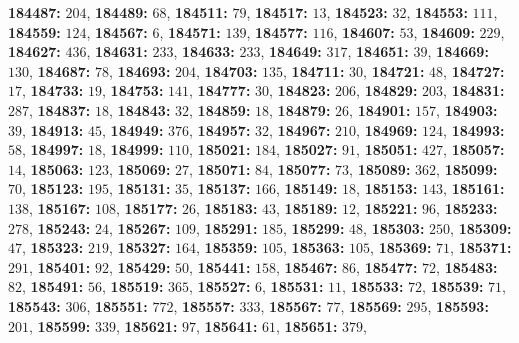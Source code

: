 \textsf{\bfseries 184487:} $204$, \textsf{\bfseries 184489:} $68$, \textsf{\bfseries 184511:} $79$, \textsf{\bfseries 184517:} $13$, \textsf{\bfseries 184523:} $32$, \textsf{\bfseries 184553:} $111$, \textsf{\bfseries 184559:} $124$, \textsf{\bfseries 184567:} $6$, \textsf{\bfseries 184571:} $139$, \textsf{\bfseries 184577:} $116$, \textsf{\bfseries 184607:} $53$, \textsf{\bfseries 184609:} $229$, \textsf{\bfseries 184627:} $436$, \textsf{\bfseries 184631:} $233$, \textsf{\bfseries 184633:} $233$, \textsf{\bfseries 184649:} $317$, \textsf{\bfseries 184651:} $39$, \textsf{\bfseries 184669:} $130$, \textsf{\bfseries 184687:} $78$, \textsf{\bfseries 184693:} $204$, \textsf{\bfseries 184703:} $135$, \textsf{\bfseries 184711:} $30$, \textsf{\bfseries 184721:} $48$, \textsf{\bfseries 184727:} $17$, \textsf{\bfseries 184733:} $19$, \textsf{\bfseries 184753:} $141$, \textsf{\bfseries 184777:} $30$, \textsf{\bfseries 184823:} $206$, \textsf{\bfseries 184829:} $203$, \textsf{\bfseries 184831:} $287$, \textsf{\bfseries 184837:} $18$, \textsf{\bfseries 184843:} $32$, \textsf{\bfseries 184859:} $18$, \textsf{\bfseries 184879:} $26$, \textsf{\bfseries 184901:} $157$, \textsf{\bfseries 184903:} $39$, \textsf{\bfseries 184913:} $45$, \textsf{\bfseries 184949:} $376$, \textsf{\bfseries 184957:} $32$, \textsf{\bfseries 184967:} $210$, \textsf{\bfseries 184969:} $124$, \textsf{\bfseries 184993:} $58$, \textsf{\bfseries 184997:} $18$, \textsf{\bfseries 184999:} $110$, \textsf{\bfseries 185021:} $184$, \textsf{\bfseries 185027:} $91$, \textsf{\bfseries 185051:} $427$, \textsf{\bfseries 185057:} $14$, \textsf{\bfseries 185063:} $123$, \textsf{\bfseries 185069:} $27$, \textsf{\bfseries 185071:} $84$, \textsf{\bfseries 185077:} $73$, \textsf{\bfseries 185089:} $362$, \textsf{\bfseries 185099:} $70$, \textsf{\bfseries 185123:} $195$, \textsf{\bfseries 185131:} $35$, \textsf{\bfseries 185137:} $166$, \textsf{\bfseries 185149:} $18$, \textsf{\bfseries 185153:} $143$, \textsf{\bfseries 185161:} $138$, \textsf{\bfseries 185167:} $108$, \textsf{\bfseries 185177:} $26$, \textsf{\bfseries 185183:} $43$, \textsf{\bfseries 185189:} $12$, \textsf{\bfseries 185221:} $96$, \textsf{\bfseries 185233:} $278$, \textsf{\bfseries 185243:} $24$, \textsf{\bfseries 185267:} $109$, \textsf{\bfseries 185291:} $185$, \textsf{\bfseries 185299:} $48$, \textsf{\bfseries 185303:} $250$, \textsf{\bfseries 185309:} $47$, \textsf{\bfseries 185323:} $219$, \textsf{\bfseries 185327:} $164$, \textsf{\bfseries 185359:} $105$, \textsf{\bfseries 185363:} $105$, \textsf{\bfseries 185369:} $71$, \textsf{\bfseries 185371:} $291$, \textsf{\bfseries 185401:} $92$, \textsf{\bfseries 185429:} $50$, \textsf{\bfseries 185441:} $158$, \textsf{\bfseries 185467:} $86$, \textsf{\bfseries 185477:} $72$, \textsf{\bfseries 185483:} $82$, \textsf{\bfseries 185491:} $56$, \textsf{\bfseries 185519:} $365$, \textsf{\bfseries 185527:} $6$, \textsf{\bfseries 185531:} $11$, \textsf{\bfseries 185533:} $72$, \textsf{\bfseries 185539:} $71$, \textsf{\bfseries 185543:} $306$, \textsf{\bfseries 185551:} $772$, \textsf{\bfseries 185557:} $333$, \textsf{\bfseries 185567:} $77$, \textsf{\bfseries 185569:} $295$, \textsf{\bfseries 185593:} $201$, \textsf{\bfseries 185599:} $339$, \textsf{\bfseries 185621:} $97$, \textsf{\bfseries 185641:} $61$, \textsf{\bfseries 185651:} $379$, 
